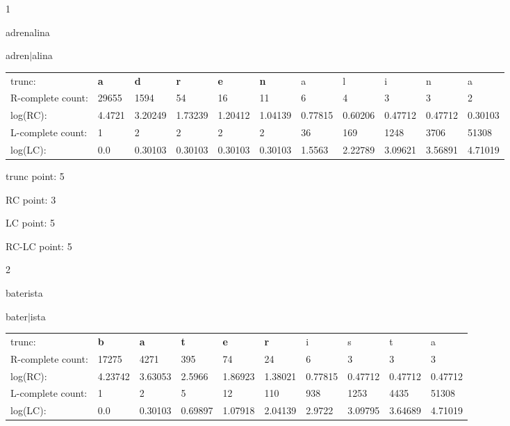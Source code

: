 \documentclass{article}
\begin{document}
1

adrenalina

adren$|$alina

\vspace{1em}

\begin{tabular}{l|llllllllll}

trunc: & {\color{red}\bf a} & {\color{red}\bf d} & {\color{red}\bf r} & {\color{red}\bf e} & {\color{red}\bf n} & a & l & i & n & a \\ 
R-complete count: & 29655 & 1594 & 54 & 16 & 11 & 6 & 4 & 3 & 3 & 2 \\ 
log(RC): & 4.4721 & 3.20249 & 1.73239 & 1.20412 & 1.04139 & 0.77815 & 0.60206 & 0.47712 & 0.47712 & 0.30103 \\ 
L-complete count: & 1 & 2 & 2 & 2 & 2 & 36 & 169 & 1248 & 3706 & 51308 \\ 
log(LC): & 0.0 & 0.30103 & 0.30103 & 0.30103 & 0.30103 & 1.5563 & 2.22789 & 3.09621 & 3.56891 & 4.71019 \\ 
\end{tabular}

trunc point: 5

RC point: 3

LC point: 5

RC-LC point: 5

\vspace{3em}



2

baterista

bater$|$ista

\vspace{1em}

\begin{tabular}{l|lllllllll}

trunc: & {\color{red}\bf b} & {\color{red}\bf a} & {\color{red}\bf t} & {\color{red}\bf e} & {\color{red}\bf r} & i & s & t & a \\ 
R-complete count: & 17275 & 4271 & 395 & 74 & 24 & 6 & 3 & 3 & 3 \\ 
log(RC): & 4.23742 & 3.63053 & 2.5966 & 1.86923 & 1.38021 & 0.77815 & 0.47712 & 0.47712 & 0.47712 \\ 
L-complete count: & 1 & 2 & 5 & 12 & 110 & 938 & 1253 & 4435 & 51308 \\ 
log(LC): & 0.0 & 0.30103 & 0.69897 & 1.07918 & 2.04139 & 2.9722 & 3.09795 & 3.64689 & 4.71019 \\ 
\end{tabular}
\end{document}
